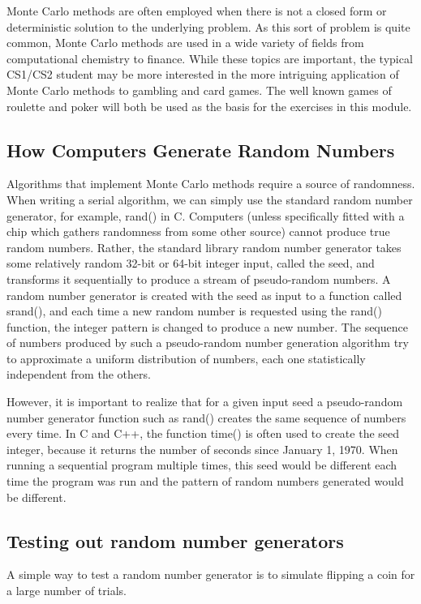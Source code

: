 \documentclass[a4paper, 11pt]{article}
\begin{document}
Monte Carlo methods are often employed when there is not a closed form or deterministic solution to the underlying problem. As this sort of problem is quite common, Monte Carlo methods are used in a wide variety of fields from computational chemistry to finance. While these topics are important, the typical CS1/CS2 student may be more interested in the more intriguing application of Monte Carlo methods to gambling and card games. The well known games of roulette and poker will both be used as the basis for the exercises in this module.

\subsection{How Computers Generate Random Numbers}

Algorithms that implement Monte Carlo methods require a source of randomness. When writing a serial algorithm, we can simply use the standard random number generator, for example, rand() in C. Computers (unless specifically fitted with a chip which gathers randomness from some other source) cannot produce true random numbers. Rather, the standard library random number generator takes some relatively random 32-bit or 64-bit integer input, called the seed, and transforms it sequentially to produce a stream of pseudo-random numbers. A random number generator is created with the seed as input to a function called srand(), and each time a new random number is requested using the rand() function, the integer pattern is changed to produce a new number. The sequence of numbers produced by such a pseudo-random number generation algorithm try to approximate a uniform distribution of numbers, each one statistically independent from the others.

However, it is important to realize that for a given input seed a pseudo-random number generator function such as rand() creates the same sequence of numbers every time. In C and C++, the function time() is often used to create the seed integer, because it returns the number of seconds since January 1, 1970. When running a sequential program multiple times, this seed would be different each time the program was run and the pattern of random numbers generated would be different.

\subsection{Testing out random number generators}

A simple way to test a random number generator is to simulate flipping a coin for a large number of trials.
\end{document}
